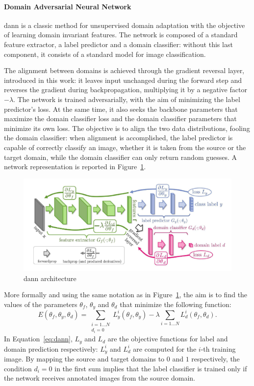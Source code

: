 \documentclass[%
    corpo=12pt,
    twoside,
    stile=classica,   
    tipotesi=magistrale,
    evenboxes,
    english,
	numerazioneromana,
]{toptesi}
\begin{document}
\paragraph{Domain Adversarial Neural Network}\label{sec:dann}
\gls{dann}\cite{ganin2015unsupervised} is a classic method for unsupervised domain adaptation with the objective of learning domain invariant features. The network is composed of a standard feature extractor, a label predictor and a domain classifier: without this last component, it consists of a standard model for image classification.

The alignment between domains is achieved through the gradient reversal layer, introduced in this work: it leaves input unchanged during the forward step and reverses the gradient during backpropagation, multiplying it by a negative factor $-\lambda$. The network is trained adversarially, with the aim of minimizing the label predictor’s loss. 
At the same time, it also seeks the backbone parameters that maximize the domain classifier loss and the domain classifier parameters that minimize its own loss.
The objective is to align the two data distributions, fooling the domain classifier: when alignment is accomplished, the label predictor is capable of correctly classify an image, whether it is taken from the source or the target domain, while the domain classifier can only return random guesses. A network representation is reported in Figure~\ref{fig:dann}.

\begin{figure}[ht!]
	\centering
	\includegraphics[width=0.95\linewidth]{imgs/dann.png}
	\caption{\gls{dann} architecture\cite{ganin2015unsupervised}}
	\label{fig:dann}
\end{figure}

More formally and using the same notation as in Figure~\ref{fig:dann}, the aim is to find the values of the parameters $\theta_f$, $\theta_y$ and $\theta_d$ that minimize the following function:
\begin{equation}
	E(\theta_f, \theta_y, \theta_d) = \sum_{
		\substack{i=1\ldots N\\d_i=0}
	}L^{i}_{y}\left(\theta_f, \theta_y\right) - 
	\lambda \sum_{i=1\ldots N}L^{i}_{d}\left(\theta_f, \theta_d\right).
	\label{eq:dann}
\end{equation}
In Equation~\ref{eq:dann}, $L_y$ and $L_d$ are the objective functions for label and domain prediction respectively: $L^{i}_{y}$ and $L^{i}_{d}$ are computed for the $i$-th training image. By mapping the source and target domains to $0$ and $1$ respectively, the condition $d_i=0$ in the first sum implies that the label classifier is trained only if the network receives annotated images from the source domain.
\end{document}
